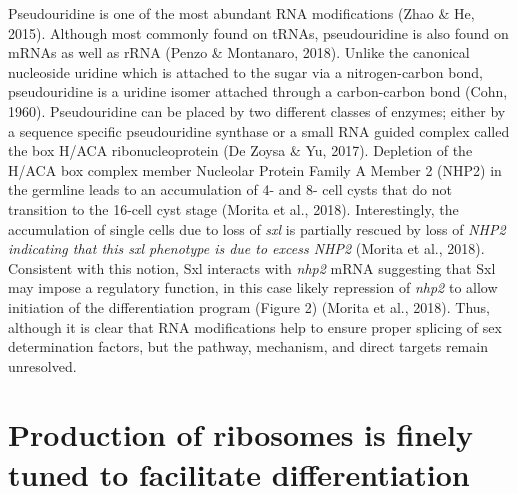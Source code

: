 \documentclass[12pt,oneside]{reedthesis}
\begin{document}
Pseudouridine is one of the most abundant RNA modifications
(Zhao \& He, 2015). Although most commonly found on tRNAs, pseudouridine is
also found on mRNAs as well as rRNA (Penzo \& Montanaro, 2018). Unlike the
canonical nucleoside uridine which is attached to the sugar via a
nitrogen-carbon bond, pseudouridine is a uridine isomer attached through
a carbon-carbon bond (Cohn, 1960). Pseudouridine can be placed by two
different classes of enzymes; either by a sequence specific
pseudouridine synthase or a small RNA guided complex called the box
H/ACA ribonucleoprotein (De Zoysa \& Yu, 2017). Depletion of the H/ACA box
complex member Nucleolar Protein Family A Member 2 (NHP2) in the
germline leads to an accumulation of 4- and 8- cell cysts that do not
transition to the 16-cell cyst stage (Morita et al., 2018). Interestingly,
the accumulation of single cells due to loss of \emph{sxl} is partially
rescued by loss of \emph{NHP2 indicating that this sxl phenotype is due to
excess NHP2} (Morita et al., 2018). Consistent with this notion, Sxl
interacts with \emph{nhp2} mRNA suggesting that Sxl may impose a regulatory
function, in this case likely repression of \emph{nhp2} to allow initiation
of the differentiation program (Figure 2) (Morita et al., 2018). Thus,
although it is clear that RNA modifications help to ensure proper
splicing of sex determination factors, but the pathway, mechanism, and
direct targets remain unresolved.

\hypertarget{production-of-ribosomes-is-finely-tuned-to-facilitate-differentiation}{%
\section{Production of ribosomes is finely tuned to facilitate differentiation}\label{production-of-ribosomes-is-finely-tuned-to-facilitate-differentiation}}
\end{document}
